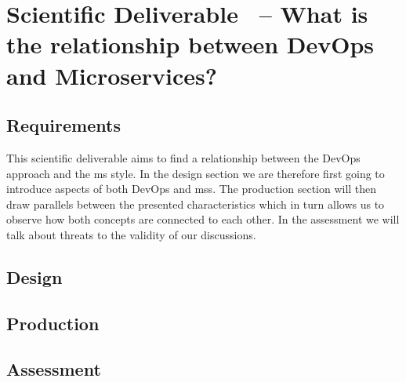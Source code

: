 \section{Scientific Deliverable \thesdel\ -- What is the relationship
between DevOps and Microservices?}

\subsection{Requirements}

This scientific deliverable aims to find a relationship between the
DevOps approach and the \gls{ms} style. In the design section we are
therefore first going to introduce aspects of both DevOps and
\glspl{ms}. The production section will then draw parallels between
the presented characteristics which in turn allows us to observe how
both concepts are connected to each other. In the assessment we will
talk about threats to the validity of our discussions.

\subsection{Design}


\subsection{Production}


\subsection{Assessment}


